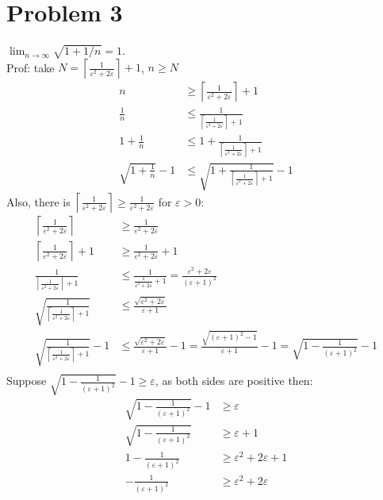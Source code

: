 \documentclass{article}
\begin{document}
\section*{Problem 3}
\(\lim_{n\rightarrow\infty}\sqrt{1+1/n}=1\).\\
Prof: take \(N=\left\lceil \frac{1}{\varepsilon^2+2\varepsilon}\right\rceil+1\), \(n\geqslant N\)
\begin{align*}
    n&\geqslant \left\lceil \frac{1}{\varepsilon^2+2\varepsilon}\right\rceil+1\\
    \frac{1}{n}&\leqslant \frac{1}{\left\lceil \frac{1}{\varepsilon^2+2\varepsilon}\right\rceil+1}\\
    1+\frac{1}{n}&\leqslant1+ \frac{1}{\left\lceil \frac{1}{\varepsilon^2+2\varepsilon}\right\rceil+1}\\
    \sqrt{1+\frac{1}{n}}-1&\leqslant\sqrt{1+ \frac{1}{\left\lceil \frac{1}{\varepsilon^2+2\varepsilon}\right\rceil+1}}-1
\end{align*}
Also, there is \(\left\lceil \frac{1}{\varepsilon^2+2\varepsilon}\right\rceil\geqslant\frac{1}{\varepsilon^2+2\varepsilon}\) for \(\varepsilon>0\):
\begin{align*}
    \left\lceil \frac{1}{\varepsilon^2+2\varepsilon}\right\rceil&\geqslant\frac{1}{\varepsilon^2+2\varepsilon}\\
    \left\lceil \frac{1}{\varepsilon^2+2\varepsilon}\right\rceil+1&\geqslant\frac{1}{\varepsilon^2+2\varepsilon}+1\\
    \frac{1}{\left\lceil \frac{1}{\varepsilon^2+2\varepsilon}\right\rceil+1}&\leqslant\frac{1}{\frac{1}{\varepsilon^2+2\varepsilon}+1}=\frac{\varepsilon^2+2\varepsilon}{(\varepsilon+1)^2}\\
    \sqrt{\frac{1}{\left\lceil \frac{1}{\varepsilon^2+2\varepsilon}\right\rceil+1}}&\leqslant \frac{\sqrt{\varepsilon^2+2\varepsilon}}{\varepsilon+1}\\
    \sqrt{\frac{1}{\left\lceil \frac{1}{\varepsilon^2+2\varepsilon}\right\rceil+1}}-1&\leqslant \frac{\sqrt{\varepsilon^2+2\varepsilon}}{\varepsilon+1}-1=\frac{\sqrt{(\varepsilon+1)^2-1}}{\varepsilon+1}-1=\sqrt{1-\frac{1}{(\varepsilon+1)^2}}-1\\
\end{align*}
Suppose \(\sqrt{1-\frac{1}{(\varepsilon+1)^2}}-1\geqslant \varepsilon\), as both sides are positive then:
\begin{align*}
    \sqrt{1-\frac{1}{(\varepsilon+1)^2}}-1&\geqslant \varepsilon\\
    \sqrt{1-\frac{1}{(\varepsilon+1)^2}}&\geqslant \varepsilon+1\\
    1-\frac{1}{(\varepsilon+1)^2}&\geqslant \varepsilon^2+2\varepsilon+1\\
    -\frac{1}{(\varepsilon+1)^2}&\geqslant \varepsilon^2+2\varepsilon
\end{align*}
\end{document}
